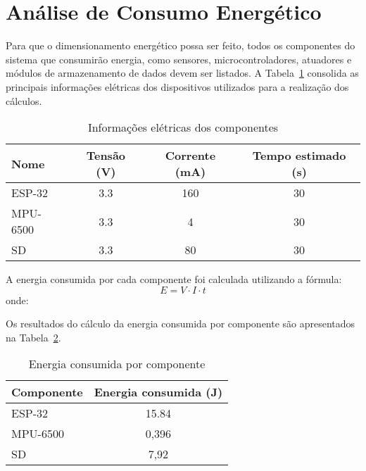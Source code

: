 

\section{Análise de Consumo Energético}

Para que o dimensionamento energético possa ser feito, todos os componentes do sistema que consumirão energia, como sensores, microcontroladores, atuadores e módulos de armazenamento de dados devem ser listados. A Tabela~\ref{tab:componentes} consolida as principais informações elétricas dos dispositivos utilizados para a realização dos cálculos.

\begin{table}[ht]
    \centering
    \caption{Informações elétricas dos componentes}
    \label{tab:componentes}
    \begin{tabular}{l c c c}
        \toprule
        Nome & Tensão (V) & Corrente (mA) & Tempo estimado (s) \\
        \midrule
        ESP-32 & 3.3 & 160 & 30 \\
        MPU-6500 & 3.3 & 4 & 30 \\
        SD & 3.3 & 80 & 30 \\
        \bottomrule
    \end{tabular}
\end{table}



A energia consumida por cada componente foi calculada utilizando a fórmula:
\begin{equation}
E = V \cdot I \cdot t
\end{equation}
onde:

Os resultados do cálculo da energia consumida por componente são apresentados na Tabela~\ref{tab:energia_consumida}.

\begin{table}[ht]
    \centering
    \caption{Energia consumida por componente}
    \label{tab:energia_consumida}
    \begin{tabular}{l c}
        \toprule
        Componente & Energia consumida (J) \\
        \midrule
        ESP-32 & 15.84 \\
        MPU-6500 & 0,396 \\
        SD & 7,92 \\
        \bottomrule
    \end{tabular}
\end{table}

